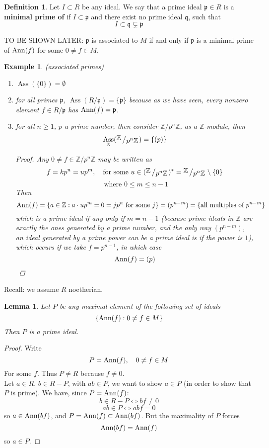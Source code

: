 \documentclass[12pt]{article}
\newcommand{\z}{\mathbb{Z}}
\newcommand{\ann}[1]{\textup{Ann}(#1)}
\DeclareMathOperator{\Ass}{Ass}
\newcommand{\bigslant}[2]{{\raisebox{.2em}{$#1$}\left/\raisebox{-.2em}{$#2$}\right.}}
\def\p{\mathfrak{p}}
\newtheorem{lemma}[theorem]{Lemma}
\newtheorem*{eg}{Example}
\theoremstyle{definition}
\newtheorem{definition}[theorem]{Definition}
\begin{document}
\begin{definition}
Let $I\subset R$ be any ideal. We say that a prime ideal $\p\in R$ is a \textbf{minimal prime of } if $I \subset \p$ and there exist no prime ideal $\mathfrak{q}$, such that 
\[
I \subset \mathfrak{q} \subsetneq \p
\]
\end{definition}
TO BE SHOWN LATER: $\p $ is associated to $M$ if and only if $\p$ is a minimal prime of $\ann{f}$ for some $0\neq f \in M$.
\begin{eg}
(associated primes)
\begin{enumerate}
    \item $\Ass(\{0\}) = \emptyset$
    \item for all primes $\p$, $\Ass(R/\p) = \{\p\}$ because as we have seen, every nonzero element $f\in R/\p$ has $\ann{f} = \p$.
    \item for all $n\geq 1$, $p$ a prime number, then consider $\z/p^n\z$, as a $\z$-module, then
    \[
    \Ass_\z (\bigslant{\z}{p^n \z}) = \{(p)\}
    \]
    \begin{proof}
    Any $0\neq f \in \z/p^n \z$ may be written as
    \[
    f = k p^n = up^m, \quad \text{for some } u\in(\bigslant{\z}{p^n \z})^\ast = \bigslant{\z}{p^n \z} \setminus \{0\}
    \]
    \[
    \text{ where }
    0\leq m\leq n-1
    \]
    Then 
    \[
    \ann{f} = \{a\in \z: a\cdot up^m = 0 = jp^n\text{ for some $j$}\}= (p^{n-m}) = \{\text{all multiples of $p^{n-m}$}\}
    \]
    which is a prime ideal if any only if $m=n-1$ (because prime ideals in $\z$ are exactly the ones generated by a prime number, and the only way $(p^{n-m})$, an ideal generated by a prime power can be a prime ideal is if the power is $1$), which occurs if we take $f= p^{n-1}$, in which case 
    \[
    \ann{f} = (p)
    \]
    \end{proof}
\end{enumerate}

\end{eg}
Recall: we assume $R$ noetherian.
\begin{lemma}
Let $P$ be any maximal element of the following set of ideals
\[
\{\ann{f}: 0\neq f \in M\}
\]
Then $P$ is a prime ideal.
\end{lemma}
\begin{proof}
Write
\[
P = \ann{f}, \quad 0\neq f \in M
\]
For some $f$. Thus $P\neq R$ because $f\neq 0$.\\
Let $a\in R$, $b\in R-P$, with $ab\in P$, we want to show $a\in P$ (in order to show that $P$ is prime). We have, since $P = \ann{f}$:
\[
b\in R-P \iff bf \neq 0 
\]
\[
ab\in P \iff abf=0
\]
so $a\in \ann{bf}$, and $P = \ann{f} \subset \ann{bf}$. But the maximality of $P$ forces 
\[
\ann{bf} = \ann{f}
\]
so $a\in P$.
\end{proof}
\end{document}
